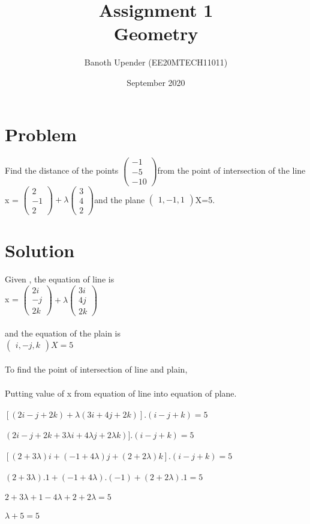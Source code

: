 \documentclass{article}
\title{Assignment 1
\\Geometry }
\author{Banoth Upender (EE20MTECH11011) }
\date{September 2020}
\newcommand{\myvec}[1]{\ensuremath{\begin{pmatrix}#1\end{pmatrix}}}
\begin{document}
\maketitle


\section{Problem}
Find the distance of the points \myvec{-1 \\-5 \\-10}from the point of intersection of the line x = $\myvec{2 \\-1 \\2} + \lambda \myvec{3 \\4 \\2}$and the plane \myvec{1 , -1 , 1}X=5.

\section{Solution}
Given , the equation of line is
\\x = $\myvec{2i \\-j \\2k} + \lambda \myvec{3i \\4j \\2k}$
\\
\\and the equation of the plain is
\\
 $\myvec{i , -j , k}X=5$
\\
\\To find the point of intersection of line and plain,
\\
\\Putting value of x from equation of line into equation of plane.
\\
\\$[(2i - j + 2k)+ \lambda(3i + 4j + 2k)].(i -j + k) = 5 $
\\
\\$(2i - j + 2k +3\lambda i + 4\lambda j + 2\lambda k )].(i - j + k) = 5 $
\\
\\$[(2 + 3\lambda)i + (-1 + 4\lambda)j + (2 + 2\lambda)k].(i - j + k) = 5 $
\\
\\$(2 + 3\lambda).1 + (-1 +4\lambda).(-1) + (2 + 2\lambda).1 = 5 $
\\
\\ $2 + 3\lambda + 1 -4\lambda + 2 + 2\lambda = 5 $
\\
\\ $ \lambda + 5 = 5$  
\end{document}
